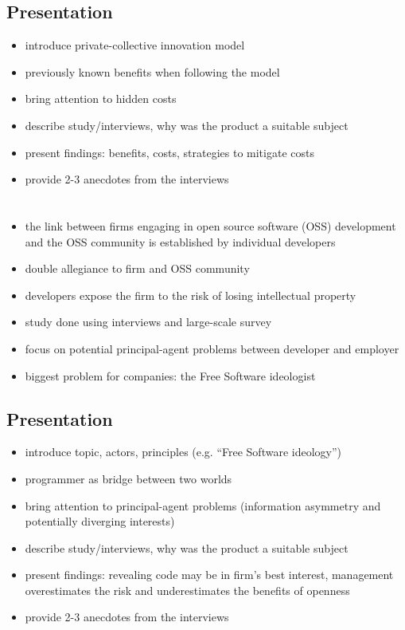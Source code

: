 \documentclass[a4paper]{scrartcl}
\begin{document}
\subsection*{Presentation}

\begin{itemize}
\item introduce private-collective innovation model
\item previously known benefits when following the model
\item bring attention to hidden costs
\item describe study/interviews, why was the product a suitable subject
\item present findings: benefits, costs, strategies to mitigate costs
\item provide 2-3 anecdotes from the interviews
\end{itemize}


\section*{}

\begin{itemize}
\item the link between firms engaging in open source software (OSS) development and the OSS community is established by individual developers 
\item double allegiance to firm and OSS community
\item developers expose the firm to the risk of losing intellectual property
\item study done using interviews and large-scale survey
\item focus on potential principal-agent problems between developer and employer
\item biggest problem for companies: the Free Software ideologist
\end{itemize}

\subsection*{Presentation}

\begin{itemize}
\item introduce topic, actors, principles (e.g. ``Free Software ideology'')
\item programmer as bridge between two worlds
\item bring attention to principal-agent problems (information asymmetry and potentially diverging interests)
\item describe study/interviews, why was the product a suitable subject
\item present findings: revealing code may be in firm's best interest, management overestimates the risk and underestimates the benefits of openness
\item provide 2-3 anecdotes from the interviews
\end{itemize}


\printbibliography[keyword=innovation]
\end{document}
